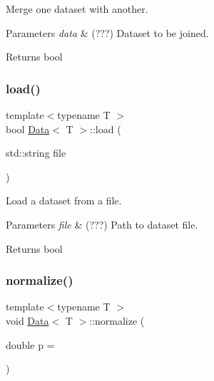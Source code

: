 Merge one dataset with another. 


\begin{DoxyParams}{Parameters}
{\em data} & (???) Dataset to be joined. \\
\hline
\end{DoxyParams}
\begin{DoxyReturn}{Returns}
bool 
\end{DoxyReturn}
\mbox{\label{class_data_a1d15d02eb38c6fb9ebf5d29ecafe7eee}} 
\subsubsection{\texorpdfstring{load()}{load()}}
{\footnotesize\ttfamily template$<$typename T $>$ \\
bool \hyperlink{class_data}{Data}$<$ T $>$\+::load (\begin{DoxyParamCaption}\item[{std\+::string}]{file }\end{DoxyParamCaption})}



Load a dataset from a file. 


\begin{DoxyParams}{Parameters}
{\em file} & (???) Path to dataset file. \\
\hline
\end{DoxyParams}
\begin{DoxyReturn}{Returns}
bool 
\end{DoxyReturn}
\mbox{\label{class_data_a3271dd8204296537222ed74c5aab1a03}} 
\subsubsection{\texorpdfstring{normalize()}{normalize()}\hspace{0.1cm}{\footnotesize\ttfamily [1/2]}}
{\footnotesize\ttfamily template$<$typename T $>$ \\
void \hyperlink{class_data}{Data}$<$ T $>$\+::normalize (\begin{DoxyParamCaption}\item[{double}]{p = {} }\end{DoxyParamCaption})}



